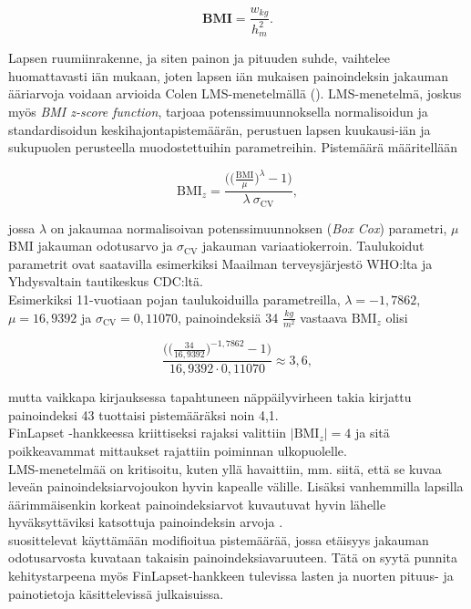 \documentclass[finnish]{docopts}
\begin{document}
$$
\textbf{BMI} = \frac{w_{kg}}{h_{m}^2}.
$$

Lapsen ruumiinrakenne, ja siten painon ja pituuden suhde, vaihtelee huomattavasti iän mukaan, joten lapsen iän mukaisen painoindeksin jakauman ääriarvoja voidaan arvioida Colen LMS-menetelmällä (\cite{cole90}). LMS-menetelmä, joskus myös \textit{BMI z-score function}, tarjoaa potenssimuunnoksella normalisoidun ja standardisoidun keskihajontapistemäärän, perustuen lapsen kuukausi-iän ja sukupuolen perusteella muodostettuihin parametreihin. Pistemäärä määritellään

$$
\text{BMI}_z = \frac{\bigg( \big( \frac{\text{BMI}}{\mu}\big)^\lambda - 1 \bigg)}{\lambda \ \sigma_{\text{CV}}},
$$

jossa $\lambda$ on jakaumaa normalisoivan potenssimuunnoksen (\textit{Box Cox}) parametri, $\mu$ BMI jakauman odotusarvo ja $\sigma_{\text{CV}}$ jakauman variaatiokerroin. Taulukoidut parametrit ovat saatavilla esimerkiksi Maailman terveysjärjestö WHO:lta ja Yhdysvaltain tautikeskus CDC:ltä.\\

Esimerkiksi 11-vuotiaan pojan taulukoiduilla parametreilla, $\lambda = -1,7862$, $\mu = 16,9392$ ja $\sigma_{\text{CV}} = 0,11070$, painoindeksiä 34 $\frac{kg}{m^2}$ vastaava $\text{BMI}_z$ olisi

$$
\frac{\bigg( \big( \frac{34}{16,9392}\big)^{-1,7862} - 1 \bigg)}{16,9392 \cdot 0,11070} \approx 3,6,
$$

mutta vaikkapa kirjauksessa tapahtuneen näppäilyvirheen takia kirjattu painoindeksi 43 tuottaisi pistemääräksi noin 4,1.\\

FinLapset -hankkeessa kriittiseksi rajaksi valittiin $|\text{BMI}_z| = 4$ ja sitä poikkeavammat mittaukset rajattiin poiminnan ulkopuolelle.\\

LMS-menetelmää on kritisoitu, kuten yllä havaittiin, mm. siitä, että se kuvaa leveän painoindeksiarvojoukon hyvin kapealle välille. Lisäksi vanhemmilla lapsilla äärimmäisenkin korkeat painoindeksiarvot kuvautuvat hyvin lähelle hyväksyttäviksi katsottuja painoindeksin arvoja \cite{flegal13, cdc13}. \\

\cite{flegal13} suosittelevat käyttämään modifioitua pistemäärää, jossa etäisyys jakauman odotusarvosta kuvataan takaisin painoindeksiavaruuteen. Tätä on syytä punnita kehitystarpeena myös FinLapset-hankkeen tulevissa lasten ja nuorten pituus- ja painotietoja käsittelevissä julkaisuissa. \\
\end{document}
